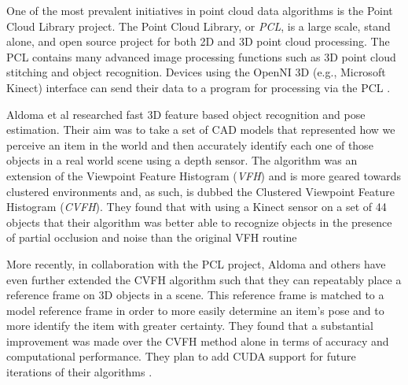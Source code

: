 One of the most prevalent initiatives in point cloud data algorithms is the Point Cloud Library project. The Point Cloud Library, or \emph{PCL}, is a large scale, stand alone, and open source project for both 2D and 3D point cloud processing. The PCL contains many advanced image processing functions such as 3D point cloud stitching and object recognition. Devices using the OpenNI 3D (e.g., Microsoft Kinect) interface can send their data to a program  for processing via the PCL \cite{PCL2012}.

Aldoma et al researched fast 3D feature based object recognition and pose estimation. Their aim was to take a set of CAD models that represented how we perceive an item in the world and then accurately identify each one of those objects in a real world scene using a depth sensor. The algorithm was an extension of the Viewpoint Feature Histogram (\emph{VFH}) and is more geared towards clustered environments and, as such, is dubbed the Clustered Viewpoint Feature Histogram (\emph{CVFH}). They found that with using a Kinect sensor on a set of 44 objects that their algorithm was better able to recognize objects in the presence of partial occlusion and noise than the original VFH routine \cite{Aldoma2011}

More recently, in collaboration with the PCL project, Aldoma and others have even further extended the CVFH algorithm such that they can repeatably place a reference frame on 3D objects in a scene. This reference frame is matched to a model reference frame in order to more easily determine an item's pose and to more identify the item with greater certainty. They found that a substantial improvement was made over the CVFH method alone in terms of accuracy and computational performance. They plan to add CUDA support for future iterations of their algorithms \cite{Aldoma2012}.